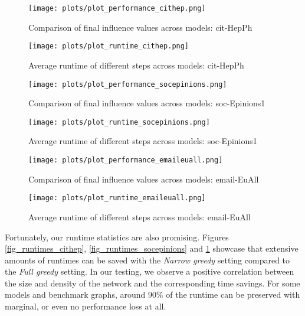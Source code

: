 \documentclass[pdflatex,sn-mathphys-num]{sn-jnl}
\begin{document}
\begin{figure}[p]
\centering
\begin{minipage}[b]{0.45\textwidth}
\texttt{[image: plots/plot\_performance\_cithep.png]}
\caption{Comparison of final influence values across models: cit-HepPh}
\label{fig_performance_cithep}
\end{minipage}
\hfill
\begin{minipage}[b]{0.45\textwidth}
\texttt{[image: plots/plot\_runtime\_cithep.png]}
\caption{Average runtime of different steps across models: cit-HepPh}
\label{fig_runtimes_cithep}
\end{minipage}
\vspace{5mm}
\centering
\begin{minipage}[b]{0.45\textwidth}
\texttt{[image: plots/plot\_performance\_socepinions.png]}
\caption{Comparison of final influence values across models: soc-Epinions1}
\label{fig_performance_socepinions}
\end{minipage}
\hfill
\begin{minipage}[b]{0.45\textwidth}
\texttt{[image: plots/plot\_runtime\_socepinions.png]}
\caption{Average runtime of different steps across models: soc-Epinions1}
\label{fig_runtimes_socepinions}
\end{minipage}
\vspace{5mm}
\centering
\begin{minipage}[b]{0.45\textwidth}
\texttt{[image: plots/plot\_performance\_emaileuall.png]}
\caption{Comparison of final influence values across models: email-EuAll}
\label{fig_performance_emaileuall}
\end{minipage}
\hfill
\begin{minipage}[b]{0.45\textwidth}
\texttt{[image: plots/plot\_runtime\_emaileuall.png]}
\caption{Average runtime of different steps across models: email-EuAll}
\label{fig_runtimes_emaileuall}
\end{minipage}
\end{figure}

Fortunately, our runtime statistics are also promising. Figures \ref{fig_runtimes_cithep}, \ref{fig_runtimes_socepinions} and \ref{fig_runtimes_emaileuall} showcase that extensive amounts of runtimes can be saved with the \textit{Narrow greedy} setting compared to the \textit{Full greedy} setting. In our testing, we observe a positive correlation between the size and density of the network and the corresponding time savings. For some models and benchmark graphs, around $90\%$ of the runtime can be preserved with marginal, or even no performance loss at all.
\end{document}
